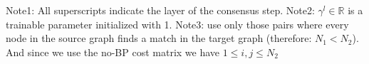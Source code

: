 Note1: All superscripts indicate the layer of the consensus step.
Note2: $\gamma^l \in \mathbb{R}$ is a trainable parameter initialized with 1.
Note3: \cite{fey2020_update} use only those pairs where every node in the source graph finds a match in the target graph (therefore: $N_1 < N_2$). And since we use the no-BP cost matrix we have $1 \leq i, j \leq N_2$








